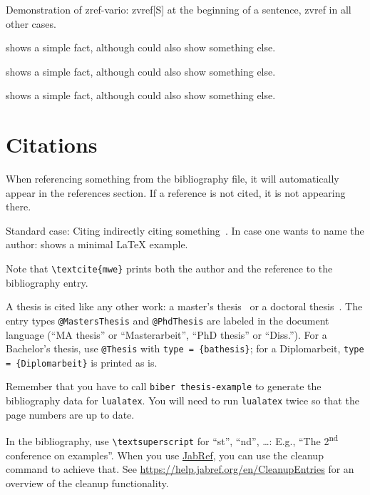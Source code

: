 \documentclass[../thesis-example]{subfiles}
\begin{document}
Demonstration of zref-vario: zvref[S] at the beginning of a sentence, zvref in all other cases.

\begin{ltgexample}
 shows a simple fact, although  could also show something else.

 shows a simple fact, although  could also show something else.

 shows a simple fact, although  could also show something else.
\end{ltgexample}

\section{Citations}

When referencing something from the bibliography file, it will automatically appear in the references section.
If a reference is not cited, it is not appearing there.

\begin{ltgexample}
Standard case: Citing indirectly citing something~\cite{mwe}.
In case one wants to name the author: \textcite{mwe} shows a minimal \LaTeX{} example.
\end{ltgexample}

Note that \texttt{\textbackslash textcite\{mwe\}} prints both the author and the reference to the bibliography entry.

A thesis is cited like any other work: a master's thesis~\cite{Shannon1940} or a doctoral thesis~\cite{Nash1950}.
The entry types \texttt{@MastersThesis} and \texttt{@PhdThesis} are labeled in the document language (\enquote{MA thesis} or \enquote{Masterarbeit}, \enquote{PhD thesis} or \enquote{Diss.}).
For a Bachelor's thesis, use \texttt{@Thesis} with \texttt{type = \{bathesis\}}; for a Diplomarbeit, \texttt{type = \{Diplomarbeit\}} is printed as is.

Remember that you have to call \texttt{biber thesis-example} to generate the bibliography data for \texttt{lualatex}.
You will need to run \texttt{lualatex} twice so that the page numbers are up to date.


In the bibliography, use \texttt{\textbackslash textsuperscript} for \enquote{st}, \enquote{nd}, \ldots:
E.g., \enquote{The 2\textsuperscript{nd} conference on examples}.
When you use \href{https://www.jabref.org}{JabRef}, you can use the cleanup command to achieve that.
See \url{https://help.jabref.org/en/CleanupEntries} for an overview of the cleanup functionality.
\end{document}
